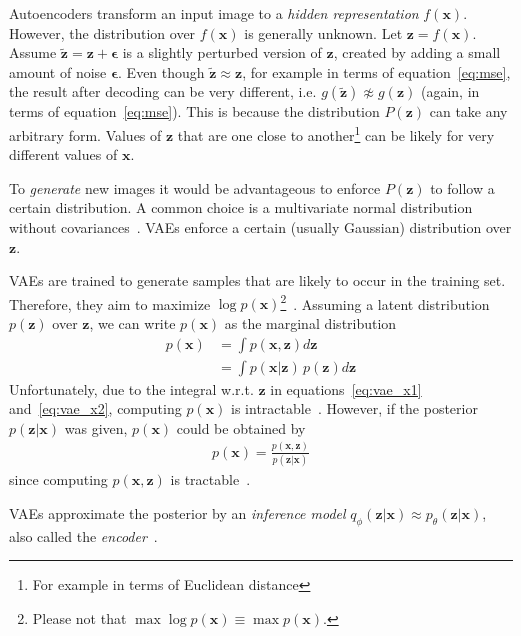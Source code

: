 Autoencoders transform an input image to a \textit{hidden representation} $f(\bm{x})$.
However, the distribution over $f(\bm{x})$ is generally unknown.
Let $\bm{z} = f(\bm{x})$.
Assume $\bm{\tilde{z}} = \bm{z} + \bm{\epsilon}$ is a slightly perturbed version of $\bm{z}$, created by adding a small amount of noise $\bm{\epsilon}$.
Even though $\bm{\tilde{z}} \approx \bm{z}$, for example in terms of equation~\ref{eq:mse}, the result after decoding can be very different, i.e. $g(\bm{\tilde{z}}) \not\approx g(\bm{z})$ (again, in terms of equation~\ref{eq:mse}).
This is because the distribution $P(\bm{z})$ can take any arbitrary form.
Values of $\bm{z}$ that are one close to another\footnote{For example in terms of Euclidean distance} can be likely for very different values of $\bm{x}$.

To \textit{generate} new images it would be advantageous to enforce $P(\bm{z})$ to follow a certain distribution.
A common choice is a multivariate normal distribution without covariances~\citep[pp. 24, 25]{kingma2019introduction}.
\acp{VAE} enforce a certain (usually Gaussian) distribution over $\bm{z}$.

\acp{VAE} are trained to generate samples that are likely to occur in the training set.
Therefore, they aim to maximize $\log p(\bm{x})$\footnote{Please not that $\max \log  p(\bm{x}) \equiv \max  p(\bm{x})$.}~\citep[p. 18]{kingma2019introduction}.
Assuming a latent distribution $p(\bm{z})$ over $\bm{z}$, we can write $p(\bm{x})$ as the marginal distribution
\begin{align}
    p(\bm{x}) &= \int p(\bm{x}, \bm{z})d\bm{z} \label{eq:vae_x1}\\
    &= \int p(\bm{x}|\bm{z})\,p(\bm{z})d\bm{z} \label{eq:vae_x2}
\end{align}
Unfortunately, due to the integral w.r.t. $\bm{z}$ in equations~\ref{eq:vae_x1} and~\ref{eq:vae_x2}, computing $p(\bm{x})$ is intractable~\citep[p. 13]{kingma2019introduction}.
However, if the posterior $p(\bm{z}|\bm{x})$ was given, $p(\bm{x})$ could be obtained by
\begin{align}
    p(\bm{x}) = \frac{p(\bm{x}, \bm{z})}{p(\bm{z}|\bm{x})}
\end{align}
since computing $p(\bm{x}, \bm{z})$ is tractable~\citep[p. 14]{kingma2019introduction}.

\acp{VAE} approximate the posterior by an \textit{inference model} $q_\phi(\bm{z}|\bm{x}) \approx p_\theta(\bm{z}|\bm{x})$, also called the \textit{encoder}~\citep[p. 15]{kingma2019introduction}.

